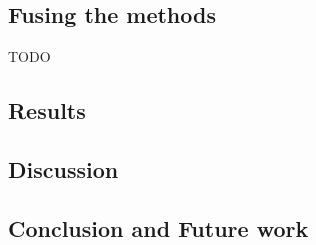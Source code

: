 \subsection{Fusing the methods}
	TODO

\subsection{Results}
\subsection{Discussion}  %
\subsection{Conclusion and Future work}




% 
% 
% 
% 
% 
% 
% 
% 
